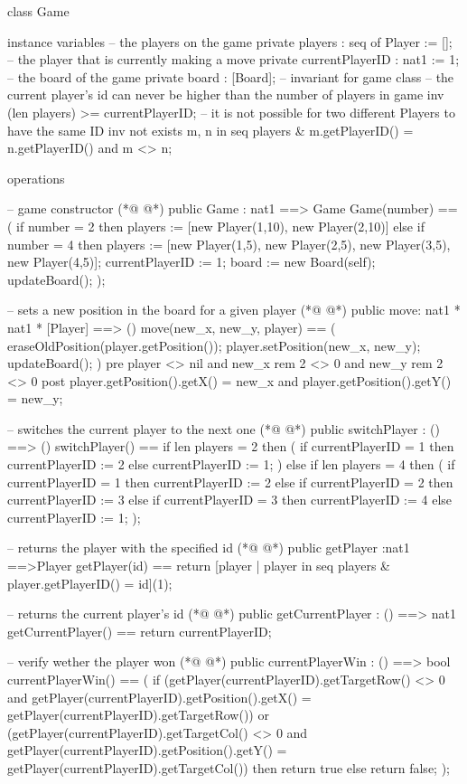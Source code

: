 \begin{vdmpp}[breaklines=true]
class Game

instance variables
 -- the players on the game
 private players : seq of Player := [];
 -- the player that is currently making a move
 private currentPlayerID : nat1 := 1;
 -- the board of the game
 private board : [Board];
 -- invariant for game class
 -- the current player's id can never be higher than the number of players in game
 inv (len players) >= currentPlayerID;
 -- it is not possible for two different Players to have the same ID
 inv not exists m, n in seq players & m.getPlayerID() = n.getPlayerID() and m <> n;

operations
 
  -- game constructor
(*@
\label{Game:19}
@*)
  public Game : nat1 ==> Game
  Game(number) ==
  (
   if number = 2
   then players := [new Player(1,10), new Player(2,10)]
   else if number = 4 
   then players := [new Player(1,5), new Player(2,5), new Player(3,5), new Player(4,5)];
   currentPlayerID := 1;
   board := new Board(self);
   updateBoard();
  );
  
  -- sets a new position in the board for a given player
(*@
\label{move:32}
@*)
  public move: nat1 * nat1 * [Player] ==> ()
  move(new_x, new_y, player) ==
  (
   eraseOldPosition(player.getPosition());
   player.setPosition(new_x, new_y);
   updateBoard();
  )
  pre player <> nil and new_x rem 2 <> 0 and new_y rem 2 <> 0 
  post player.getPosition().getX() = new_x and player.getPosition().getY() = new_y;

  -- switches the current player to the next one
(*@
\label{switchPlayer:43}
@*)
  public switchPlayer : () ==> ()
  switchPlayer() == 
  if len players = 2
  then
  (
   if currentPlayerID = 1 then currentPlayerID := 2 
   else currentPlayerID := 1;
  )
  else if len players = 4
  then
  (
   if currentPlayerID = 1 then currentPlayerID := 2 
   else if currentPlayerID = 2 then currentPlayerID := 3
   else if currentPlayerID = 3 then currentPlayerID := 4 
   else currentPlayerID := 1;
  );
  
  -- returns the player with the specified id
(*@
\label{getPlayer:61}
@*)
  public getPlayer :nat1 ==>Player 
  getPlayer(id) ==
  return [player | player in seq players  &  player.getPlayerID() = id](1);
  
  -- returns the current player's id
(*@
\label{getCurrentPlayer:66}
@*)
  public getCurrentPlayer : () ==> nat1
  getCurrentPlayer() ==
  return currentPlayerID;
  
  -- verify wether the player won
(*@
\label{currentPlayerWin:71}
@*)
  public currentPlayerWin : () ==> bool
  currentPlayerWin() ==
  (
   if (getPlayer(currentPlayerID).getTargetRow() <> 0 and getPlayer(currentPlayerID).getPosition().getX() = getPlayer(currentPlayerID).getTargetRow()) 
     or 
    (getPlayer(currentPlayerID).getTargetCol() <> 0 and getPlayer(currentPlayerID).getPosition().getY() = getPlayer(currentPlayerID).getTargetCol())
     then return true
   else return false;  
  );
  

\end{vdmpp}
